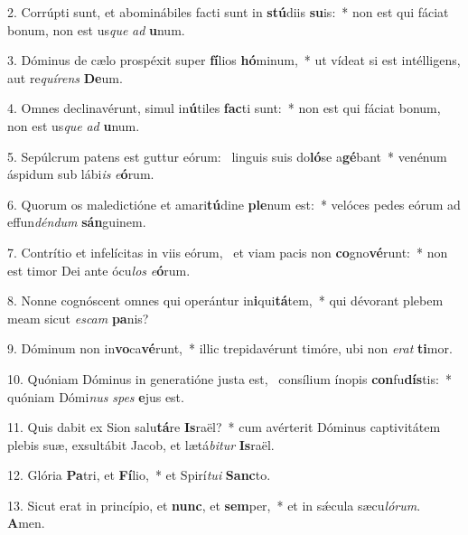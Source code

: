 2. Corrúpti sunt, et abominábiles facti sunt in \textbf{stú}diis \textbf{su}is:~*  non est qui fáciat bonum, non est us\textit{que} \textit{ad} \textbf{u}num.\

3. Dóminus de cælo prospéxit super \textbf{fí}lios \textbf{hó}minum,~*  ut vídeat si est intélligens, aut re\textit{quí}\textit{rens} \textbf{De}um.\

4. Omnes declinavérunt, simul in\textbf{ú}tiles \textbf{fac}ti sunt:~*  non est qui fáciat bonum, non est us\textit{que} \textit{ad} \textbf{u}num.\

5. Sepúlcrum patens est guttur eórum: \dag\  linguis suis do\textbf{ló}se a\textbf{gé}bant~*  venénum áspidum sub lábi\textit{is} \textit{e}\textbf{ó}rum.\

6. Quorum os maledictióne et amari\textbf{tú}dine \textbf{ple}num est:~*  velóces pedes eórum ad effun\textit{dén}\textit{dum} \textbf{sán}guinem.\

7. Contrítio et infelícitas in viis eórum, \dag\  et viam pacis non \textbf{co}gno\textbf{vé}runt:~*  non est timor Dei ante ócu\textit{los} \textit{e}\textbf{ó}rum.\

8. Nonne cognóscent omnes qui operántur in\textbf{i}qui\textbf{tá}tem,~*  qui dévorant plebem meam sicut \textit{es}\textit{cam} \textbf{pa}nis?\

9. Dóminum non in\textbf{vo}ca\textbf{vé}runt,~*  illic trepidavérunt timóre, ubi non \textit{e}\textit{rat} \textbf{ti}mor.\

10. Quóniam Dóminus in generatióne justa est, \dag\  consílium ínopis \textbf{con}fu\textbf{dís}tis:~*  quóniam Dómi\textit{nus} \textit{spes} \textbf{e}jus est.\

11. Quis dabit ex Sion salu\textbf{tá}re \textbf{Is}raël?~*  cum avérterit Dóminus captivitátem plebis suæ, exsultábit Jacob, et lætá\textit{bi}\textit{tur} \textbf{Is}raël.\

12. Glória \textbf{Pa}tri, et \textbf{Fí}lio,~*  et Spirí\textit{tu}\textit{i} \textbf{Sanc}to.\

13. Sicut erat in princípio, et \textbf{nunc}, et \textbf{sem}per,~*  et in sǽcula sæcu\textit{ló}\textit{rum}. \textbf{A}men.\


